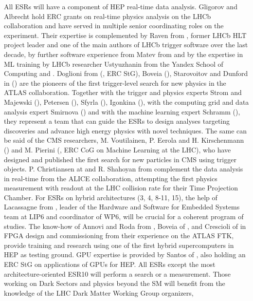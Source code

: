 All ESRs will have a component of HEP real-time data analysis. 
Gligorov and Albrecht hold ERC grants on real-time physics analysis on the LHCb collaboration and have served in
multiple senior coordinating roles on the experiment. 
Their expertise is complemented by Raven from \nikhefentity, former LHCb HLT project leader and one of
the main authors of LHCb trigger software over the last decade, by further software experience from Matev from \cernentity
and by the expertise in ML training by LHCb researcher Ustyuzhanin from the Yandex School of Computing and \cernentity.   
Doglioni from (\lundentity, ERC StG), Boveia (\ohioentity),  Starovoitov and
Dunford in (\heidelbergentity) are the pioneers of the first trigger-level search for new physics in the
ATLAS collaboration. Together with the trigger and physics experts Strom and Majewski (\oregonentity), 
Petersen (\cern), Sfyrla (\unigeentity), Igonkina (\nikhefentity), with the computing grid and data analysis expert 
Smirnova (\lundentity) and with the machine learning expert Schramm (\unigeentity), 
they represent a team that can guide the ESRs to design analyses targeting discoveries and
advance high energy physics with novel techniques. 
The same can be said of the CMS researchers, M. Voutilainen, P. Eerola and H. Kirschenmann (\helsinkientity)
and M. Pierini (\cernentity, ERC CoG on Machine Learning at the LHC), who have designed and 
published the first search for new particles in CMS using trigger objects. P. Christiansen at \lundentity
and R. Shahoyan from \cernentity complement the data analysis in real-time from the ALICE collaboration,
attempting the first physics measurement with readout at the LHC collision rate for their Time Projection Chamber. 
%
For ESRs on hybrid architectures (3, 4, 8-11, 15), the help of
Lacassagne from \sorbonneentity, leader of the Hardware and Software for Embedded Systems team at LIP6 and
coordinator of WP6, will be crucial for a coherent program of studies. 
The know-how of Annovi and Roda from \pisaentity, Boveia of \ohioentity, and Crescioli of \cnrsentity in FPGA design
and commissioning from their experience on the ATLAS FTK, provide training and research 
using one of the first hybrid supercomputers in HEP as testing ground. 
GPU expertise is provided by Santos of \santiagoentity,
also holding an ERC StG on applications of GPUs for HEP. 
%
All ESRs except the most architecture-oriented ESR10 will perform a search or a measurement. Those
working on Dark Sectors and physics beyond the SM will benefit from the knowledge of the LHC Dark Matter Working Group organizers, 
